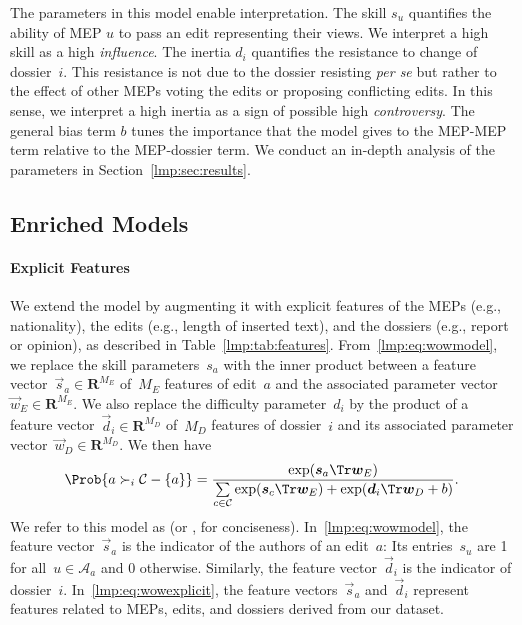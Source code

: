 The parameters in this model enable interpretation.
The skill $s_u$ quantifies the ability of MEP $u$ to pass an edit representing their views.
We interpret a high skill as a high \textit{influence}.
The inertia $d_i$ quantifies the resistance to change of dossier~$i$.
This resistance is not due to the dossier resisting \textit{per se} but rather to the effect of other MEPs voting the edits or proposing conflicting edits.
In this sense, we interpret a high inertia as a sign of possible high \textit{controversy}.
The general bias term $b$ tunes the importance that the model gives to the MEP-MEP term relative to the MEP-dossier term.
We conduct an in-depth analysis of the parameters in Section~\ref{lmp:sec:results}.


\subsection{Enriched Models}
\label{lmp:sec:enriched}

\paragraph{Explicit Features}

We extend the \wow{} model by augmenting it with explicit features of the MEPs (e.g., nationality), the edits (e.g., length of inserted text), and the dossiers (e.g., report or opinion), as described in Table~\ref{lmp:tab:features}.
From~\eqref{lmp:eq:wowmodel}, we replace the skill parameters~$s_a$ with the inner product between a feature vector~$\vec{s}_a \in \mathbf{R}^{M_E}$ of~$M_E$ features of edit~$a$ and the associated parameter vector~$\vec{w}_E \in \mathbf{R}^{M_E}$.
We also replace the difficulty parameter~$d_i$ by the product of a feature vector~$\vec{d}_i \in \mathbf{R}^{M_D}$ of~$M_D$ features of dossier~$i$ and its associated parameter vector~$\vec{w}_D \in \mathbf{R}^{M_D}$.
We then have
\begin{equation}
	\label{lmp:eq:wowexplicit}
	\Prob{ a \succ_i \mathcal{C} - \{ a\} } =
	\frac{\exp(\vec{s}_a\Tr \vec{w}_E) }{ \sum\limits_{c \in \mathcal{C} } \exp(\vec{s}_c\Tr \vec{w}_E) + \exp(\vec{d}_i \Tr \vec{w}_D + b) }.
\end{equation}
We refer to this model as  (or , for conciseness).
In~\eqref{lmp:eq:wowmodel}, the feature vector~$\vec{s}_a$ is the indicator of the authors of an edit~$a$:
Its entries~$s_u$ are 1 for all~$u \in \mathcal{A}_a$ and 0 otherwise.
Similarly, the feature vector~$\vec{d}_i$ is the indicator of dossier~$i$.
In~\eqref{lmp:eq:wowexplicit}, the feature vectors~$\vec{s}_a$ and~$\vec{d}_i$ represent features related to MEPs, edits, and dossiers derived from our dataset.

